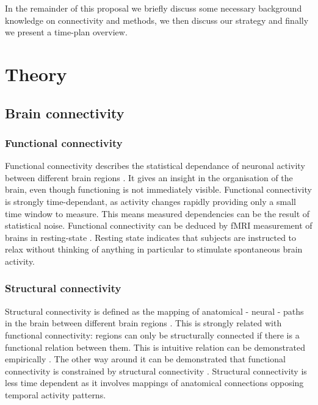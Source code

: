 \documentclass[a4paper, 10pt, english, twocolumn]{article}
\begin{document}
In the remainder of this proposal we briefly discuss some necessary background knowledge on connectivity and methods, we then discuss our strategy and finally we present a time-plan overview.

\section{Theory}

\subsection*{Brain connectivity}

\subsubsection*{Functional connectivity}
Functional connectivity describes the statistical dependance of neuronal activity between different brain regions \cite{friston1993functional}.
It gives an insight in the organisation of the brain, even though functioning is not immediately visible.
Functional connectivity is strongly time-dependant, as activity changes rapidly providing only a small time window to measure.
This means measured dependencies can be the result of statistical noise.
Functional connectivity can be deduced by fMRI measurement of brains in resting-state \cite{Lowe2000, doria2010, Bullmore2009}.
Resting state indicates that subjects are instructed to relax without thinking of anything in particular to stimulate spontaneous brain activity.

\subsubsection*{Structural connectivity}
Structural connectivity is defined as the mapping of anatomical - neural - paths in the brain between different brain regions \cite{friston1994}.
This is strongly related with functional connectivity: regions can only be structurally connected if there is a functional relation between them.
This is intuitive relation can be demonstrated empirically \cite{vandenheuvel2009}.
The other way around it can be demonstrated that functional connectivity is constrained by structural connectivity \cite{cabral2012}.
Structural connectivity is less time dependent as it involves mappings of anatomical connections opposing temporal activity patterns.
\end{document}
